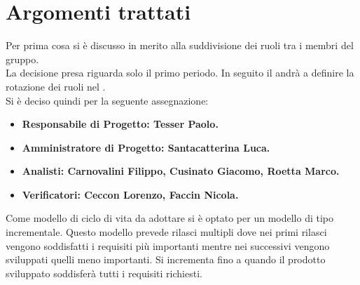 %

\section{Argomenti trattati}
	Per prima cosa si è discusso in merito alla suddivisione dei ruoli tra i membri del gruppo.\\
	La decisione presa riguarda solo il primo periodo. In seguito il \roleProjectManager{} andrà a definire la rotazione dei ruoli nel \docNameVersionPdP.\\
	Si è deciso quindi per la seguente assegnazione:
		\begin{itemize}
			\item \bfseries{Responsabile di Progetto:} \textnormal{Tesser Paolo.}
			\item \bfseries{Amministratore di Progetto:} \textnormal{Santacatterina Luca.}
			\item \bfseries{Analisti:} \textnormal{Carnovalini Filippo, Cusinato Giacomo, Roetta Marco.}
			\item \bfseries{Verificatori:} \textnormal{Ceccon Lorenzo, Faccin Nicola.}
		\end{itemize}
	Come modello di ciclo di vita da adottare si è optato per un modello di tipo incrementale. Questo modello prevede rilasci multipli dove nei primi rilasci vengono soddisfatti i requisiti più importanti mentre nei successivi vengono sviluppati quelli meno importanti. Si incrementa fino a quando il prodotto sviluppato soddisferà tutti i requisiti richiesti.
